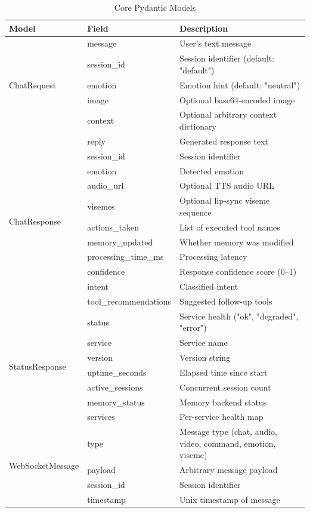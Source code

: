 \documentclass[12pt,a4paper,twoside]{report}
\begin{document}
\begin{table}[H]
\centering
{}
\begin{tabularx}{\textwidth}{|l|l|X|}
\hline
\rowcolor{phiblue!20}
\textbf{Model} & \textbf{Field} & \textbf{Description} \\
\hline
\multirow{5}{*}{ChatRequest} & message & User's text message \\
\cline{2-3}
 & session\_id & Session identifier (default: "default") \\
\cline{2-3}
 & emotion & Emotion hint (default: "neutral") \\
\cline{2-3}
 & image & Optional base64-encoded image \\
\cline{2-3}
 & context & Optional arbitrary context dictionary \\
\hline
\multirow{11}{*}{ChatResponse} & reply & Generated response text \\
\cline{2-3}
 & session\_id & Session identifier \\
\cline{2-3}
 & emotion & Detected emotion \\
\cline{2-3}
 & audio\_url & Optional TTS audio URL \\
\cline{2-3}
 & visemes & Optional lip-sync viseme sequence \\
\cline{2-3}
 & actions\_taken & List of executed tool names \\
\cline{2-3}
 & memory\_updated & Whether memory was modified \\
\cline{2-3}
 & processing\_time\_ms & Processing latency \\
\cline{2-3}
 & confidence & Response confidence score (0--1) \\
\cline{2-3}
 & intent & Classified intent \\
\cline{2-3}
 & tool\_recommendations & Suggested follow-up tools \\
\hline
\multirow{7}{*}{StatusResponse} & status & Service health ("ok", "degraded", "error") \\
\cline{2-3}
 & service & Service name \\
\cline{2-3}
 & version & Version string \\
\cline{2-3}
 & uptime\_seconds & Elapsed time since start \\
\cline{2-3}
 & active\_sessions & Concurrent session count \\
\cline{2-3}
 & memory\_status & Memory backend status \\
\cline{2-3}
 & services & Per-service health map \\
\hline
\multirow{5}{*}{WebSocketMessage} & type & Message type (chat, audio, video, command, emotion, viseme) \\
\cline{2-3}
 & payload & Arbitrary message payload \\
\cline{2-3}
 & session\_id & Session identifier \\
\cline{2-3}
 & timestamp & Unix timestamp of message \\
\hline
\end{tabularx}
\caption{Core Pydantic Models}
\end{table}
\end{document}

